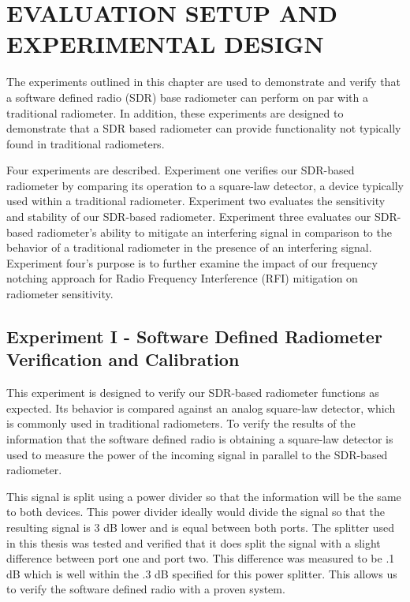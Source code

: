 

\chapter{EVALUATION SETUP AND EXPERIMENTAL DESIGN}\label{ch:exp_design}
The experiments outlined in this chapter are used to demonstrate and verify that a software defined radio (SDR) base radiometer can perform on par with a traditional radiometer.  In addition, these experiments are designed to demonstrate that a SDR based radiometer can provide functionality not typically found in traditional radiometers. 

Four experiments are described.  Experiment one verifies our SDR-based radiometer by comparing its operation to a square-law detector, a device typically used within a traditional radiometer.  Experiment two evaluates the sensitivity and stability of our SDR-based radiometer.  Experiment three evaluates our SDR-based radiometer's ability to mitigate an interfering signal in comparison to the behavior of a traditional radiometer in the presence of an interfering signal.  Experiment four's purpose is to further examine the impact of our frequency notching approach for Radio Frequency Interference (RFI) mitigation on radiometer sensitivity.

\section{Experiment I - Software Defined Radiometer Verification and Calibration}\label{Exp1}

This experiment is designed to verify our SDR-based radiometer functions as expected.  Its behavior is compared against an analog square-law detector, which is commonly used in traditional radiometers.  To verify the results of the information that the software defined radio is obtaining a square-law detector is used to measure the power of the incoming signal in parallel to the SDR-based radiometer.  

This signal is split using a power divider so that the information will be the same to both devices.  This power divider ideally would divide the signal so that the resulting signal is 3 dB lower and is equal between both ports.  The splitter used in this thesis was tested and verified that it does split the signal with a slight difference between port one and port two.  This difference was measured to be .1 dB which is well within the .3 dB specified for this power splitter.  This allows us to verify the software defined radio with a proven system.  

